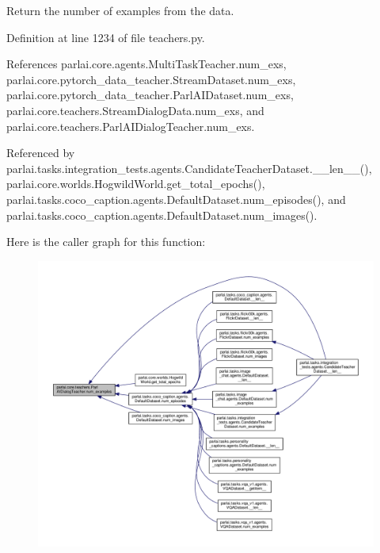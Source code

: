 \begin{DoxyVerb}Return the number of examples from the data.\end{DoxyVerb}
 

Definition at line 1234 of file teachers.\+py.



References parlai.\+core.\+agents.\+Multi\+Task\+Teacher.\+num\+\_\+exs, parlai.\+core.\+pytorch\+\_\+data\+\_\+teacher.\+Stream\+Dataset.\+num\+\_\+exs, parlai.\+core.\+pytorch\+\_\+data\+\_\+teacher.\+Parl\+A\+I\+Dataset.\+num\+\_\+exs, parlai.\+core.\+teachers.\+Stream\+Dialog\+Data.\+num\+\_\+exs, and parlai.\+core.\+teachers.\+Parl\+A\+I\+Dialog\+Teacher.\+num\+\_\+exs.



Referenced by parlai.\+tasks.\+integration\+\_\+tests.\+agents.\+Candidate\+Teacher\+Dataset.\+\_\+\+\_\+len\+\_\+\+\_\+(), parlai.\+core.\+worlds.\+Hogwild\+World.\+get\+\_\+total\+\_\+epochs(), parlai.\+tasks.\+coco\+\_\+caption.\+agents.\+Default\+Dataset.\+num\+\_\+episodes(), and parlai.\+tasks.\+coco\+\_\+caption.\+agents.\+Default\+Dataset.\+num\+\_\+images().

Here is the caller graph for this function\+:
\nopagebreak
\begin{figure}[H]
\begin{center}
\leavevmode
\includegraphics[width=350pt]{classparlai_1_1core_1_1teachers_1_1ParlAIDialogTeacher_a37c1c62c52860da9c63d9f6ed23ae6ae_icgraph}
\end{center}
\end{figure}
\mbox{\label{classparlai_1_1core_1_1teachers_1_1ParlAIDialogTeacher_a9e2eabf923a38b53865705786e07f461}} 
